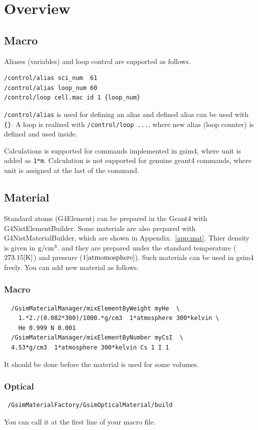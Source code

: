 \documentclass[a4paper,12pt]{article}
\begin{document}
 \section{Overview}
 \subsection{Macro}
 Aliases (variables) and loop control are supported as follows.
 \begin{screen}
  \begin{verbatim}
/control/alias sci_num  61
/control/alias loop_num 60
/control/loop cell.mac id 1 {loop_num}\end{verbatim}
 \end{screen}
{\tt /control/alias} is used for defining an alias and defined alias can
be used with {\tt \{\}}.
A loop is realized with {\tt /control/loop ...}, where new alias
(loop counter) is defined and used inside.

 Calculations is supported for commands
 implemented in gsim4, where unit is added as {\tt 1*m}.
 Calculation is not supported for genuine geant4
 commands, where unit is assigned at the last of the command.
 \subsection{Material}
 Standard atoms (G4Element) can be prepared in the Geant4 with
 G4NistElementBuilder. Some materials are also prepared with
 G4NistMaterialBuilder, which are shown in Appendix.~\ref{app:mat}.
 Thier density is given in ${\rm g}/{\rm
 cm}^3$. and they are prepared under the standard temperature
 ($273.15 [{\rm K}]$) and pressure ($1 [{\rm atmomosphere}]$).
 Such materials can be used in gsim4 freely. You can add new
 material as follows.
 \subsubsection{Macro}
 \begin{screen}
  \begin{verbatim}
  /GsimMaterialManager/mixElementByWeight myHe  \ 
    1.*2./(0.082*300)/1000.*g/cm3  1*atmosphere 300*kelvin \
    He 0.999 N 0.001
  /GsimMaterialManager/mixElementByNumber myCsI  \ 
  4.53*g/cm3  1*atmosphere 300*kelvin Cs 1 I 1\end{verbatim}
 \end{screen}
 It should be done before the material is used for some volumes.
 \subsubsection{Optical}
 \begin{screen}
  \begin{verbatim}
 /GsimMaterialFactory/GsimOpticalMaterial/build\end{verbatim}
 \end{screen}
 You can call it at the first line of your macro file.
\end{document}
